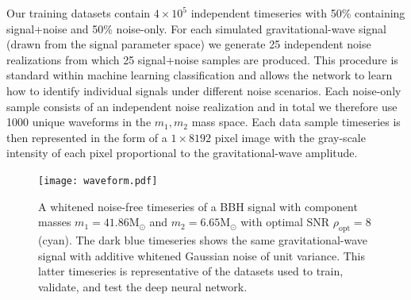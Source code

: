 \documentclass[%
showpacs,
 amsmath,amssymb,
 aps,
 twocolumn,
 prl,
 reprint,
floatfix,
]{revtex4-1}
\newcommand{\optsnr}{\rho_{\mathrm{opt}}}
\begin{document}
%
%
Our training datasets contain $4\times 10^{5}$ independent timeseries with 50\%
containing signal+noise and 50\% noise-only. For each simulated
gravitational-wave signal (drawn from the signal parameter space) we generate
25 independent noise realizations from which 25 signal+noise samples are
produced. This procedure is standard within machine learning classification and
allows the network to learn how to identify individual signals under different
noise scenarios. Each noise-only sample consists of an independent noise
realization and in total we therefore use 1000 unique waveforms in the
$m_{1},m_{2}$ mass space. Each data sample timeseries is then represented in
the form of a $1 \times 8192$ pixel image with the gray-scale intensity of each
pixel proportional to the gravitational-wave amplitude.

%
%


\begin{figure} 
\texttt{[image: waveform.pdf]}
\caption{A whitened noise-free timeseries of a \ac{BBH} signal with component
masses $m_{1}=41.86\mathrm{M}_{\odot}$ and $m_{2}=6.65\mathrm{M}_{\odot}$ with
optimal \ac{SNR} $\optsnr=8$ (cyan). The dark blue timeseries shows the same
gravitational-wave signal with additive whitened Gaussian noise of unit
variance. This latter timeseries is representative of the datasets used to
train, validate, and test the deep neural network.\label{fig:waveform}}
\end{figure}
\end{document}

